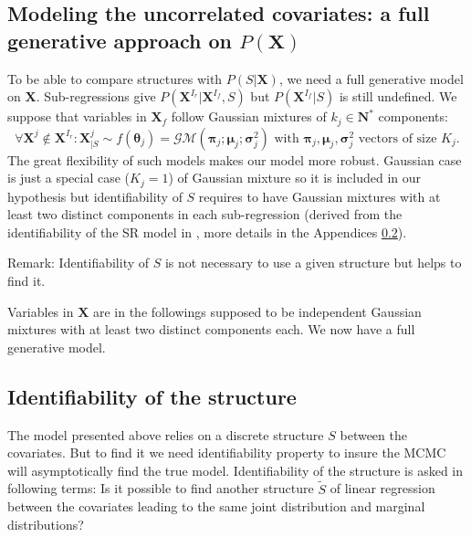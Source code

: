 \documentclass[12pt,a4paper]{report}
\begin{document}
	\subsection{Modeling the uncorrelated covariates: a full generative approach on $P(\boldsymbol{X})$} \label{sectionfullgen}
	To be able to compare structures with $P(S|\boldsymbol{X})$, we need a full generative model on $\boldsymbol{X}$. Sub-regressions give $P(\boldsymbol{X}^{I_r}|\boldsymbol{X}^{I_f},S) $ but $P(\boldsymbol{X}^{I_f}|S)$ is still undefined. We suppose that variables in $\boldsymbol{X}_f$ follow Gaussian mixtures of $k_j \in \mathbf{N}^*$ components: 
	\begin{equation}
			\forall \boldsymbol{X}^j \notin \boldsymbol{X}^{I_r} : \boldsymbol{X}^j_{|S} \sim f(\boldsymbol{\theta}_j)=\mathcal{GM}(\boldsymbol{\pi}_j;\boldsymbol{\mu}_j;\boldsymbol{\sigma}^2_j) \textrm{ with } \boldsymbol{\pi}_j,\boldsymbol{\mu}_j,\boldsymbol{\sigma}^2_j \textrm{ vectors of size } K_j. \label{mixtureX1}
		\end{equation}
		The great flexibility \cite{mclachlan2004finite} of such models makes our model more robust. Gaussian case is just a special case ($K_j=1$) of Gaussian mixture so it is included in our hypothesis but identifiability of $S$ requires to have Gaussian mixtures with at least two distinct components in each sub-regression (derived from the identifiability of the SR model in \cite{maugis2009variable}, more details in the Appendices \ref{preuveident}).
				
		Remark:  Identifiability of $S$ is not necessary to use a given structure but helps to find it.

		Variables in $\boldsymbol{X}$ are in the followings supposed to be independent Gaussian mixtures with at least two distinct components each. 
	We now have a full generative model.
	
\subsection{Identifiability of the structure} \label{preuveident}
	The model presented above relies on a discrete structure $S$ between the covariates. But to find it we need identifiability property to insure the MCMC will asymptotically find the true model. Identifiability of the structure is asked in following terms: Is it possible to find another structure $\tilde{S}$ of linear regression between the covariates leading to the same joint distribution and marginal distributions? 
	
\end{document}
